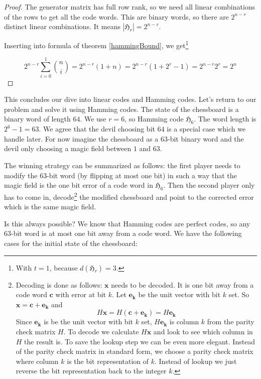 \begin{proof}

The generator matrix has full row rank, so we need all linear combinations of the rows to get all the code words. This are binary words, so there are $2^{n - r}$ distinct linear combinations. It means $|\mathfrak{H}_r| = 2^{n - r}$.

Inserting into formula of theorem \ref{hammingBound}, we get\footnote{With $t = 1$, because $d(\mathfrak{H}_r) = 3$.}

$$
2^{n - r} \sum_{i = 0}^1 \binom{n}{i} = 2^{n - r} (1 + n) = 2^{n - r} (1 + 2^r - 1) = 2^{n - r} 2^r = 2^n
$$

\end{proof}

This concludes our dive into linear codes and Hamming codes. Let's return to our problem and solve it using Hamming codes. The state of the chessboard is a binary word of length $64$. We use $r = 6$, so Hamming code $\mathfrak{H}_6$. The word length is $2^6 - 1 = 63$. We agree that the devil choosing bit $64$ is a special case which we handle later. For now imagine the chessboard as a $63$-bit binary word and the devil only choosing a magic field between $1$ and $63$.

\newpage

The winning strategy can be summarized as follows: the first player needs to modify the $63$-bit word (by flipping at most one bit) in such a way that the magic field is the one bit error of a code word in $\mathfrak{H}_6$. Then the second player only has to come in, decode\footnote{Decoding\label{decodingSideNote} is done as follows: $\bm{x}$ needs to be decoded. It is one bit away from a code word $\bm{c}$ with error at bit $k$. Let $\bm{e_k}$ be the unit vector with bit $k$ set. So $\bm{x} = \bm{c} + \bm{e_k}$ and 
$$
H \bm{x} = H (\bm{c} + \bm{e_k}) = H \bm{e_k}
$$
Since $\bm{e_k}$ is be the unit vector with bit $k$ set, $H \bm{e_k}$ is column $k$ from the parity check matrix $H$. To decode we calculate $H \bm{x}$ and look to see which column in $H$ the result is. To save the lookup step we can be even more elegant. Instead of the parity check matrix in standard form, we choose a parity check matrix where column $k$ is the bit representation of $k$. Instead of lookup we just reverse the bit representation back to the integer $k$.
} the modified chessboard and point to the corrected error which is the same magic field.

Is this always possible? We know that Hamming codes are perfect codes, so any $63$-bit word is at most one bit away from a code word. We have the following cases for the initial state of the chessboard:


